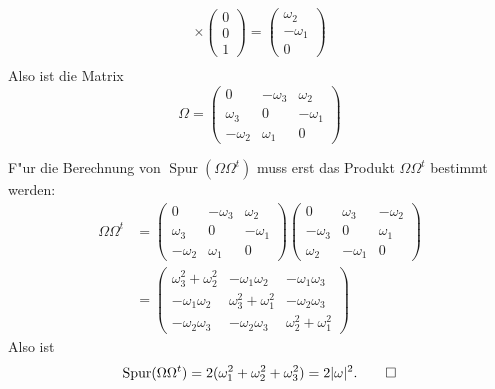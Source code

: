 \begin{loesung}
\begin{teilaufgaben}
\begin{align*}
\times
\begin{pmatrix}0\\0\\1\end{pmatrix}
=
\begin{pmatrix}\omega_2\\-\omega_1\\0\end{pmatrix}
\\
\end{align*}
Also ist die Matrix
\[
\Omega=\begin{pmatrix}
0&-\omega_3&\omega_2\\
\omega_3&0&-\omega_1\\
-\omega_2&\omega_1&0
\end{pmatrix}
\]
\item
F"ur die Berechnung von $\operatorname{Spur}(\Omega\Omega^t)$ muss erst
das Produkt $\Omega\Omega^t$ bestimmt werden:
\begin{align*}
\Omega\Omega^t
&=
\begin{pmatrix}
0&-\omega_3&\omega_2\\
\omega_3&0&-\omega_1\\
-\omega_2&\omega_1&0
\end{pmatrix}
\begin{pmatrix}
0&\omega_3&-\omega_2\\
-\omega_3&0&\omega_1\\
\omega_2&-\omega_1&0
\end{pmatrix}
\\
&=
\begin{pmatrix}
\omega_3^2+\omega_2^2&-\omega_1\omega_2&-\omega_1\omega_3\\
-\omega_1\omega_2&\omega_3^2+\omega_1^2&-\omega_2\omega_3\\
-\omega_2\omega_3&-\omega_2\omega_3&\omega_2^2+\omega_1^2
\end{pmatrix}
\end{align*}
Also ist
\[
\operatorname{Spur}(\Omega\Omega^t)
=
2(\omega_1^2+\omega_2^2+\omega_3^2)=2|\omega|^2.
\qedhere
\]
\end{teilaufgaben}
\end{loesung}

